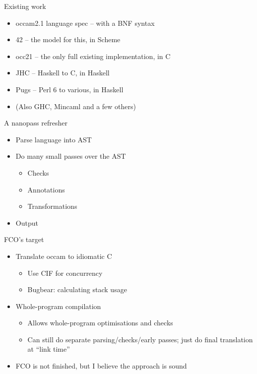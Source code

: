 \documentclass[adam,pdf,slideColor]{prosper}
\begin{document}
\begin{slide}{Existing work}
\begin{itemize}
\item occam2.1 language spec -- with a BNF syntax
\item 42 -- the model for this, in Scheme
\item occ21 -- the only full existing implementation, in C
\item JHC -- Haskell to C, in Haskell
\item Pugs -- Perl 6 to various, in Haskell
\item (Also GHC, Mincaml and a few others)
\end{itemize}
\end{slide}

\begin{slide}{A nanopass refresher}
\begin{itemize}
\item Parse language into AST
\item Do many small passes over the AST
\begin{itemize}
\item Checks
\item Annotations
\item Transformations
\end{itemize}
\item Output
\end{itemize}
\end{slide}

\begin{slide}{FCO's target}
\begin{itemize}
\item Translate occam to idiomatic C
\begin{itemize}
\item Use CIF for concurrency
\item Bugbear: calculating stack usage
\end{itemize}
\item Whole-program compilation
\begin{itemize}
\item Allows whole-program optimisations and checks
\item Can still do separate parsing/checks/early passes; just do final
  translation at ``link time''
\end{itemize}
\item FCO is not finished, but I believe the approach is sound
\end{itemize}
\end{slide}
\end{document}
